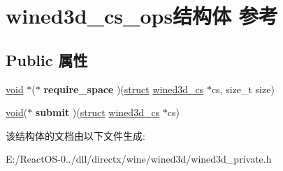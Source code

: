 \hypertarget{structwined3d__cs__ops}{}\section{wined3d\+\_\+cs\+\_\+ops结构体 参考}
\label{structwined3d__cs__ops}
\subsection*{Public 属性}
\begin{DoxyCompactItemize}
\item 
\mbox{\label{structwined3d__cs__ops_aca8b107e0073eeeacb6e9b603cbb3529}} 
\hyperlink{interfacevoid}{void} $\ast$($\ast$ {\bfseries require\+\_\+space} )(\hyperlink{interfacestruct}{struct} \hyperlink{structwined3d__cs}{wined3d\+\_\+cs} $\ast$cs, size\+\_\+t size)
\item 
\mbox{\label{structwined3d__cs__ops_afb1c08483f99a14931a43acf5ca4c1bb}} 
\hyperlink{interfacevoid}{void}($\ast$ {\bfseries submit} )(\hyperlink{interfacestruct}{struct} \hyperlink{structwined3d__cs}{wined3d\+\_\+cs} $\ast$cs)
\end{DoxyCompactItemize}


该结构体的文档由以下文件生成\+:\begin{DoxyCompactItemize}
\item 
E\+:/\+React\+O\+S-\/0../dll/directx/wine/wined3d/wined3d\+\_\+private.\+h\end{DoxyCompactItemize}
